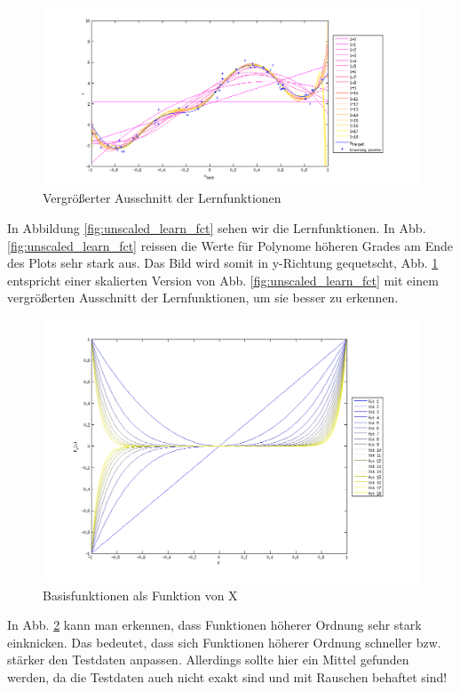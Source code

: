 \begin{figure}[hp!]
\begin{center}
 \includegraphics[width=1\textwidth]{./figures/1_1_1_scal_learn_fct}
 \caption[Vergrö\ss{}erter Ausschnitt der Lernfunktionen]{Vergrö\ss{}erter Ausschnitt der Lernfunktionen}
\label{fig:scal_learn_fct}
\end{center}
\end{figure}

In Abbildung \ref{fig:unscaled_learn_fct} sehen wir die Lernfunktionen.
In Abb. \ref{fig:unscaled_learn_fct} reissen die Werte für Polynome höheren Grades am Ende des Plots sehr stark aus.
Das Bild wird somit in y-Richtung gequetscht, Abb. \ref{fig:scal_learn_fct} entspricht einer skalierten Version von Abb. \ref{fig:unscaled_learn_fct} mit einem  vergrö\ss{}erten Ausschnitt der Lernfunktionen, um sie besser zu erkennen.

\begin{figure}[hp!]
\begin{center}
 \includegraphics[width=1\textwidth]{./figures/1_1_1_base_fct}
 \caption[Basisfunktionen als Funktion von X]{Basisfunktionen als Funktion von X}
\label{fig:base_fct}
\end{center}
\end{figure}
In Abb. \ref{fig:base_fct} kann man erkennen, dass Funktionen höherer Ordnung sehr stark einknicken. Das bedeutet, dass sich Funktionen höherer Ordnung 
schneller bzw. stärker den Testdaten anpassen. Allerdings sollte hier ein Mittel gefunden werden, da die Testdaten auch nicht exakt sind und mit
Rauschen behaftet sind! 

